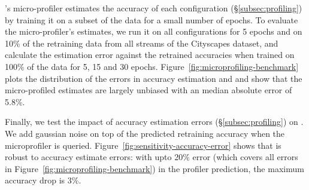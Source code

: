 
\name's micro-profiler estimates the accuracy of each configuration (\S\ref{subsec:profiling}) by training it on a subset of the data for a small number of epochs. 
To evaluate the micro-profiler's estimates, we run it on all configurations for 5 epochs and on 10\% of the retraining data from all streams of the Cityscapes dataset, and calculate the estimation error against the retrained accuracies when trained on 100\% of the data for 5, 15 and 30 epochs. 
Figure~\ref{fig:microprofiling-benchmark} plots the distribution of the errors in accuracy estimation and and show that the micro-profiled estimates are largely unbiased with an median absolute error of 5.8\%. %





Finally, we test the impact of accuracy estimation errors (\S\ref{subsec:profiling}) on \name.
We add gaussian noise on top of the predicted retraining accuracy when the microprofiler is queried. 
Figure~\ref{fig:sensitivity-accuracy-error} shows that \name is robust to accuracy estimate errors: with upto 20\% error (which covers all errors in Figure~\ref{fig:microprofiling-benchmark}) in the profiler prediction, the maximum accuracy drop is 3\%. 

